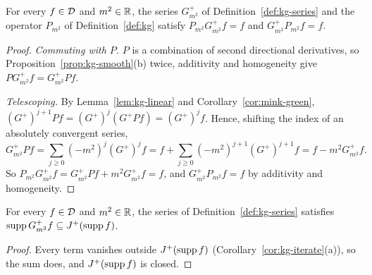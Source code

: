 \begin{theorem}\label{thm:kg-green-id}
For every $f\in\mathcal D$ and $m^2\in\mathbb R$, the series $G^+_{m^2}$ of Definition~\ref{def:kg-series} and the
operator $P_{m^2}$ of Definition~\ref{def:kg} satisfy $P_{m^2}G^+_{m^2}f=f$ and $G^+_{m^2}P_{m^2}f=f$.
\end{theorem}
\begin{proof}
\emph{Commuting with $P$.} $P$ is a combination of second directional derivatives, so
Proposition~\ref{prop:kg-smooth}(b) twice, additivity and homogeneity give $PG^+_{m^2}f=G^+_{m^2}Pf$.

\emph{Telescoping.} By Lemma~\ref{lem:kg-linear} and Corollary~\ref{cor:mink-green},
$(G^+)^{j+1}Pf=(G^+)^j(G^+Pf)=(G^+)^jf$. Hence, shifting the index of an absolutely convergent
series,
\[
G^+_{m^2}Pf=\sum_{j\ge0}(-m^2)^j(G^+)^jf=f+\sum_{j\ge0}(-m^2)^{j+1}(G^+)^{j+1}f=f-m^2G^+_{m^2}f.
\]
So $P_{m^2}G^+_{m^2}f=G^+_{m^2}Pf+m^2G^+_{m^2}f=f$, and $G^+_{m^2}P_{m^2}f=f$ by additivity and
homogeneity.
\end{proof}

\begin{proposition}[Supports]\label{prop:kg-supp}
For every $f\in\mathcal D$ and $m^2\in\mathbb R$, the series of Definition~\ref{def:kg-series} satisfies
$\operatorname{supp} G^+_{m^2}f\subseteq J^+(\operatorname{supp} f)$.
\end{proposition}
\begin{proof}
Every term vanishes outside $J^+(\operatorname{supp} f)$ (Corollary~\ref{cor:kg-iterate}(a)), so the sum does, and
$J^+(\operatorname{supp} f)$ is closed.
\end{proof}

